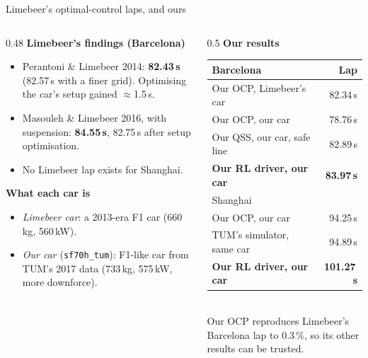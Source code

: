 \documentclass[aspectratio=169,10pt]{beamer}
\begin{document}
\begin{frame}{Limebeer's optimal-control laps, and ours}
  \small
  \begin{columns}[T]
    \begin{column}{0.48\textwidth}
      \textbf{Limebeer's findings (Barcelona)}
      \begin{itemize}
        \item Perantoni \& Limebeer 2014: \textbf{82.43\,s} (82.57\,s with a finer grid). Optimising the car's setup gained $\approx$1.5\,s.
        \item Masouleh \& Limebeer 2016, with suspension: \textbf{84.55\,s}, 82.75\,s after setup optimisation.
        \item No Limebeer lap exists for Shanghai.
      \end{itemize}
      \textbf{What each car is}
      \begin{itemize}
        \item \emph{Limebeer car}: a 2013-era F1 car (660\,kg, 560\,kW).
        \item \emph{Our car} (\texttt{sf70h\_tum}): F1-like car from TUM's 2017 data (733\,kg, 575\,kW, more downforce).
      \end{itemize}
    \end{column}
    \begin{column}{0.5\textwidth}
      \textbf{Our results}\\[3pt]
      \begin{tabular}{@{}lr@{}}
        \toprule
        Barcelona & Lap\\
        \midrule
        Our OCP, Limebeer's car & 82.34\,s\\
        Our OCP, our car & 78.76\,s\\
        Our QSS, our car, safe line & 82.89\,s\\
        \textbf{Our RL driver, our car} & \textbf{83.97\,s}\\
        \midrule
        Shanghai & \\
        \midrule
        Our OCP, our car & 94.25\,s\\
        TUM's simulator, same car & 94.89\,s\\
        \textbf{Our RL driver, our car} & \textbf{101.27\,s}\\
        \bottomrule
      \end{tabular}
      \\[3pt]\footnotesize Our OCP reproduces Limebeer's Barcelona lap to 0.3\,\%, so its other results can be trusted.
    \end{column}
  \end{columns}
\end{frame}
\end{document}
